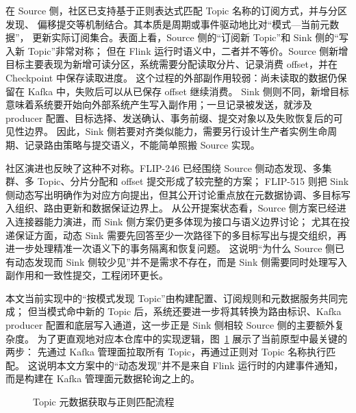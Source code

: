 在 Source 侧，社区已支持基于正则表达式匹配 Topic 名称的订阅方式，并与分区发现、
偏移提交等机制结合\cite{flip246}。其本质是周期或事件驱动地比对“模式—当前元数据”，
更新实际订阅集合。表面上看，Source 侧的“订阅新 Topic”和 Sink 侧的“写入新 Topic”非常对称；
但在 Flink 运行时语义中，二者并不等价。Source 侧新增目标主要表现为新增可读分区，系统需要分配读取分片、记录消费 offset，并在 Checkpoint 中保存读取进度。
这个过程的外部副作用较弱：尚未读取的数据仍保留在 Kafka 中，失败后可以从已保存 offset 继续消费。
Sink 侧则不同，新增目标意味着系统要开始向外部系统产生写入副作用；一旦记录被发送，就涉及 producer 配置、目标选择、发送确认、事务前缀、提交对象以及失败恢复后的可见性边界。
因此，Sink 侧若要对齐类似能力，需要另行设计生产者实例生命周期、记录路由策略与提交语义，不能简单照搬 Source 实现。

社区演进也反映了这种不对称。FLIP-246 已经围绕 Source 侧动态发现、多集群、多 Topic、分片分配和 offset 提交形成了较完整的方案\cite{flip246}；
FLIP-515 则把 Sink 侧动态写出明确作为对应方向提出，但其公开讨论重点放在元数据协调、多目标写入组织、路由更新和数据保证边界上\cite{flip515}。
从公开提案状态看，Source 侧方案已经进入连接器能力演进，而 Sink 侧方案仍更多体现为接口与语义边界讨论；
尤其在投递保证方面，动态 Sink 需要先回答至少一次路径下的多目标写出与提交组织，再进一步处理精准一次语义下的事务隔离和恢复问题。
这说明“为什么 Source 侧已有动态发现而 Sink 侧较少见”并不是需求不存在，而是 Sink 侧需要同时处理写入副作用和一致性提交，工程闭环更长。

本文当前实现中的“按模式发现 Topic”由构建配置、订阅规则和元数据服务共同完成；
但当模式命中新的 Topic 后，系统还要进一步将其转换为路由标识、Kafka producer 配置和底层写入通道，这一步正是 Sink 侧相较 Source 侧的主要额外复杂度。
为了更直观地对应本仓库中的实现逻辑，图~\ref{fig:metadata-pattern-flow} 展示了当前原型中最关键的两步：
先通过 Kafka 管理面拉取所有 Topic，再通过正则对 Topic 名称执行匹配。
这说明本文方案中的“动态发现”并不是来自 Flink 运行时的内建事件通知，而是构建在 Kafka 管理面元数据轮询之上的。

\begin{figure}[htbp]
  \centering
  \caption{Topic 元数据获取与正则匹配流程}
  \label{fig:metadata-pattern-flow}
\end{figure}

